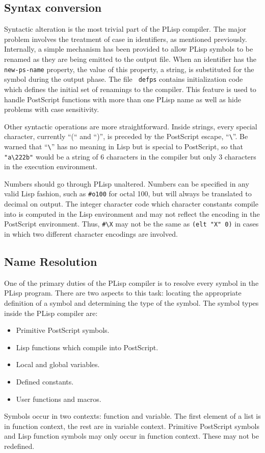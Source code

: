 \subsection{Syntax conversion}
Syntactic alteration is the most trivial part of the PLisp
compiler.  The major problem involves the treatment of case in
identifiers, as mentioned previously.  Internally, a simple mechanism
has been provided to allow PLisp symbols to be renamed as they are
being emitted to the output file.  When an identifier has the {\tt
new-ps-name} property, the value of this property, a string, is
substituted for the symbol during the output phase.  The file {\tt
defps} contains initialization code which defines the initial set of
renamings to the compiler.  This feature is used to handle PostScript
functions with more than one PLisp name
as well as hide problems with case sensitivity.

Other syntactic operations are more straightforward.  Inside strings,
every special character, currently ``(`` and ``)'', is preceded by the
PostScript escape, ``\verb+\+''.  Be warned that ``\verb+\+'' has no meaning
in Lisp but is special to PostScript, so that \verb+"a\222b"+ would be
a string of 6 characters in the compiler but only 3 characters in the
execution environment.

Numbers should go through PLisp unaltered.
Numbers can be specified in any valid Lisp fashion, such as
\verb+#o100+ for octal 100, but will always be translated to decimal
on output.  The integer character code which character constants
compile into is computed in the Lisp environment and may not reflect
the encoding in the PostScript environment.  Thus, \verb+#\X+ may not be
the same as {\tt (elt "X" 0)} in cases in which two different
character encodings are involved.

\subsection{Name Resolution}

One of the primary duties of the PLisp compiler is to resolve every
symbol in the PLisp program.  There are two aspects to this task:
locating the appropriate definition of a symbol and determining the
type of the symbol.  The symbol types inside the PLisp compiler are:
\begin{itemize}
\item Primitive PostScript symbols.
\item Lisp functions which compile into PostScript.
\item Local and global variables.
\item Defined constants.
\item User functions and macros.
\end{itemize}
Symbols occur in two contexts: function and variable.  The first
element of a list is in function context, the rest are in
variable context.  Primitive PostScript symbols and Lisp function
symbols may only occur in function context.  These may not be redefined.

